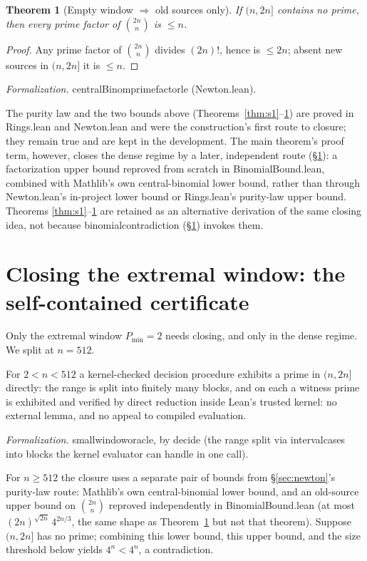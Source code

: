 \documentclass[11pt,a4paper]{amsart}
\theoremstyle{plain}
\newtheorem{theorem}{Theorem}[section]
\theoremstyle{definition}
\theoremstyle{plain}
\theoremstyle{remark}
\newcommand{\lean}[1]{\begingroup\upshape\ttfamily\def\_{\textunderscore\allowbreak}#1\endgroup}
\newcommand{\Formal}[1]{\par\smallskip\noindent\begingroup\raggedright\emph{Formalization.} #1\par\endgroup\smallskip}
\begin{document}
\begin{theorem}[Empty window $\Rightarrow$ old sources only]\label{thm:upper}
If $(n,2n]$ contains no prime, then every prime factor of $\binom{2n}{n}$ is $\le n$.
\end{theorem}

\begin{proof}
Any prime factor of $\binom{2n}{n}$ divides $(2n)!$, hence is $\le 2n$; absent new sources
in $(n,2n]$ it is $\le n$.
\end{proof}

\Formal{\lean{centralBinom\_prime\_factor\_le} (\lean{Newton.lean}).}

The purity law and the two bounds above (Theorems~\ref{thm:s1}--\ref{thm:upper}) are proved
in \lean{Rings.lean} and \lean{Newton.lean} and were the construction's first route to
closure; they remain true and are kept in the development. The main theorem's proof term,
however, closes the dense regime by a later, independent route (\S\ref{sec:erdos}): a
factorization upper bound reproved from scratch in \lean{BinomialBound.lean}, combined with
Mathlib's own central-binomial lower bound, rather than through \lean{Newton.lean}'s
in-project lower bound or \lean{Rings.lean}'s purity-law upper bound. Theorems
\ref{thm:s1}--\ref{thm:upper} are retained as an alternative derivation of the same closing
idea, not because \lean{binomial\_contradiction} (\S\ref{sec:erdos}) invokes them.

\section{Closing the extremal window: the self-contained certificate}
\label{sec:erdos}

Only the extremal window $P_{\min}=2$ needs closing, and only in the dense regime. We
split at $n=512$.

For $2<n<512$ a kernel-checked decision procedure exhibits a prime in $(n,2n]$ directly: the
range is split into finitely many blocks, and on each a witness prime is exhibited and
verified by direct reduction inside Lean's trusted kernel: no external lemma, and no
appeal to compiled evaluation.

\Formal{\lean{small\_window\_oracle}, by \lean{decide} (the range split via
\lean{interval\_cases} into blocks the kernel evaluator can handle in one call).}

For $n\ge512$ the closure uses a separate pair of bounds from \S\ref{sec:newton}'s
purity-law route: Mathlib's own central-binomial lower bound, and an old-source upper
bound on $\binom{2n}{n}$ reproved independently in \lean{BinomialBound.lean} (at most
$(2n)^{\sqrt{2n}}\,4^{2n/3}$, the same shape as Theorem~\ref{thm:upper} but not that
theorem). Suppose $(n,2n]$ has no prime; combining this lower bound, this upper bound, and
the size threshold below yields $4^n<4^n$, a contradiction.
\end{document}
